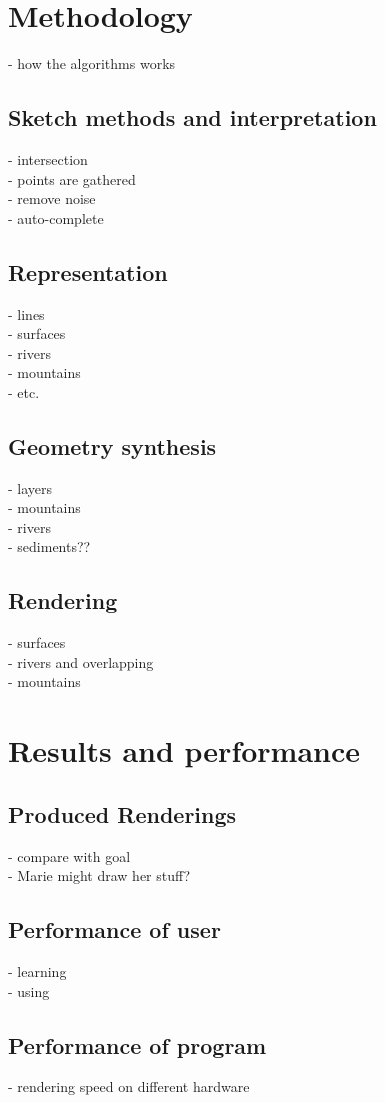 \documentclass[a4paper,10pt]{article}
\begin{document}
\section{Methodology}
- how the algorithms works
\subsection{Sketch methods and interpretation}
- intersection\\
- points are gathered\\
- remove noise\\
- auto-complete
\subsection{Representation}
- lines\\
- surfaces\\
- rivers\\
- mountains\\
- etc.
\subsection{Geometry synthesis}
- layers\\
- mountains\\
- rivers\\
- sediments??
\subsection{Rendering}
- surfaces\\
- rivers and overlapping\\
- mountains

\section{Results and performance}
\subsection{Produced Renderings}
- compare with goal\\
- Marie might draw her stuff?
\subsection{Performance of user}
- learning\\
- using
\subsection{Performance of program}
- rendering speed on different hardware
\end{document}
